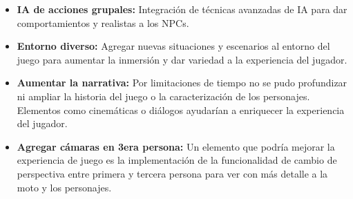 \begin{itemize}
    \item \textbf{IA de acciones grupales:} Integración de técnicas avanzadas de IA para dar comportamientos y realistas a los NPCs.
    
    \item \textbf{Entorno diverso:} Agregar nuevas situaciones y escenarios al entorno del juego para aumentar la inmersión y dar variedad a la experiencia del jugador.
    
    \item \textbf{Aumentar la narrativa:} Por limitaciones de tiempo no se pudo profundizar ni ampliar la historia del juego o la caracterización de los personajes. Elementos como cinemáticas o diálogos ayudarían a enriquecer la experiencia del jugador.
    
    \item \textbf{Agregar cámaras en 3era persona:} Un elemento que podría mejorar la experiencia de juego es la implementación de la funcionalidad de cambio de perspectiva entre primera y tercera persona para ver con más detalle a la moto y los personajes.
\end{itemize}
